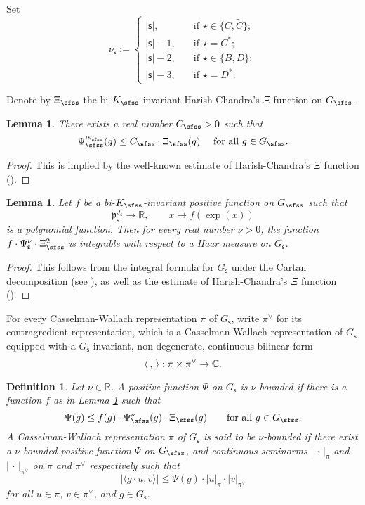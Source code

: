 \documentclass[12pt,a4paper]{amsart}
\def\abs#1{\left|{#1}\right|}
\newcommand{\p}{\mathfrak p}
\newcommand{\R}{\mathbb R}
\newcommand{\la}{\langle}
\newcommand{\ra}{\rangle}
\numberwithin{equation}{section}
\newtheorem{lem}[thm]{Lemma}
\newtheorem{defn}[thm]{Definition}
\theoremstyle{remark}
\begin{document}
Set
\[
  \nu_\mathsf s:=\begin{cases}
    \abs{\mathsf s},\quad &\textrm{if }\star\in \{C, \widetilde C\};\\
     \abs{\mathsf s}-1,\quad & \textrm{if }\star= C^*;\\
      \abs{\mathsf s}-2,\quad & \textrm{if }\star\in \{B,D\};\\
       \abs{\mathsf s}-3,\quad & \textrm{if }\star= D^*.
  \end{cases}
\]

Denote by $\Xi_\sfss$ the bi-$K_\sfss$-invariant Harish-Chandra's $\Xi$ function on $G_\sfss$.

\begin{lem}\label{boundpsi}
There exists a real number $C_\sfss>0$ such that
\[
  \Psi_\sfss^{\nu_\sfss}(g)\leq C_\sfss\cdot \Xi_\sfss (g)\quad\textrm{ for all $g\in G_\sfss$}.
\]

\end{lem}
\begin{proof}
This is implied by the well-known  estimate of Harish-Chandra's $\Xi$ function (\cite[Theorem 4.5.3]{Wa1}).
\end{proof}



\begin{lem}\label{int}
Let $f$ be a bi-$K_\sfss$-invariant positive function  on $G_\sfss$  such that
\[
  \p_\mathsf s^{J_\mathsf s}\rightarrow \R, \qquad x\mapsto f(\exp(x))
\]
is a polynomial function. Then for every real number $\nu>0$, the function $f\cdot \Psi_\mathsf s^\nu\cdot \Xi_\sfss^2$ is integrable with respect to a Haar measure on $G_\mathsf s$.
\end{lem}
\begin{proof}
  This follows from the integral formula for $G_\mathsf s$ under the Cartan decomposition (see
 \cite[Lemma 2.4.2]{Wa1}), as well as the  estimate of Harish-Chandra's $\Xi$ function (\cite[Theorem 4.5.3]{Wa1}).
\end{proof}

For every Casselman-Wallach representation $\pi$ of $G_\mathsf s$, write $\pi^\vee$ for its contragredient representation, which is a  Casselman-Wallach representation  of $G_\mathsf s$ equipped with a $G_{\mathsf s}$-invariant, non-degenerate, continuous bilinear form
 \[
   \la\,,\,\ra: \pi \times\pi^\vee\rightarrow \C.
 \]

\begin{defn}
Let $\nu\in \R$. A  positive function $\Psi$ on $G_\mathsf s$ is $\nu$-bounded if there is a  function $f$ as in Lemma \ref{int}  such that
\[
  \Psi(g)\leq f(g)\cdot \Psi_{\sfss}^\nu(g)\cdot \Xi_\sfss(g)\qquad \textrm{for all }g\in G_\sfss.
\]
A Casselman-Wallach representation $\pi$ of $G_\mathsf s$ is said to be $\nu$-bounded if there
exist a $\nu$-bounded positive function $\Psi$ on $G_\sfss$, and continuous seminorms $\abs{\,\cdot\,}_{\pi}$ and $\abs{\,\cdot\,}_{\pi^\vee}$ on  $ \pi$ and $\pi^\vee$ respectively such that
\[
 \abs{ \la g \cdot u, v\ra}\leq \Psi(g)\cdot \abs{u}_{\pi}\cdot \abs{v}_{\pi^\vee}
\]
for all $u\in \pi$, $v\in \pi^\vee$, and $g\in G_{\mathsf s}$.

\end{defn}
\end{document}
